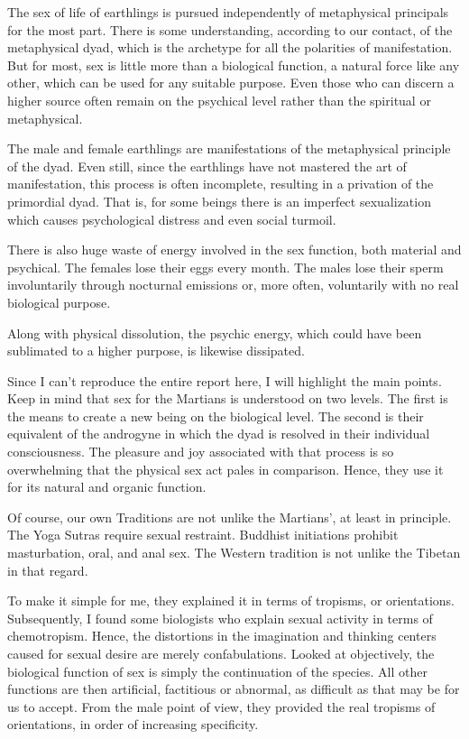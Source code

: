 \begin{quotationx}
The sex of life of earthlings is pursued independently of metaphysical principals for the most part. There is some understanding, according to our contact, of the metaphysical dyad, which is the archetype for all the polarities of manifestation. But for most, sex is little more than a biological function, a natural force like any other, which can be used for any suitable purpose. Even those who can discern a higher source often remain on the psychical level rather than the spiritual or metaphysical.

The male and female earthlings are manifestations of the metaphysical principle of the dyad. Even still, since the earthlings have not mastered the art of manifestation, this process is often incomplete, resulting in a privation of the primordial dyad. That is, for some beings there is an imperfect sexualization which causes psychological distress and even social turmoil.

There is also huge waste of energy involved in the sex function, both material and psychical. The females lose their eggs every month. The males lose their sperm involuntarily through nocturnal emissions or, more often, voluntarily with no real biological purpose.

Along with physical dissolution, the psychic energy, which could have been sublimated to a higher purpose, is likewise dissipated.
\end{quotationx}


Since I can't reproduce the entire report here, I will highlight the main points. Keep in mind that sex for the Martians is understood on two levels. The first is the means to create a new being on the biological level. The second is their equivalent of the androgyne in which the dyad is resolved in their individual consciousness. The pleasure and joy associated with that process is so overwhelming that the physical sex act pales in comparison. Hence, they use it for its natural and organic function.

Of course, our own Traditions are not unlike the Martians', at least in principle. The Yoga Sutras require sexual restraint. Buddhist initiations prohibit masturbation, oral, and anal sex. The Western tradition is not unlike the Tibetan in that regard.

To make it simple for me, they explained it in terms of tropisms, or orientations. Subsequently, I found some biologists who explain sexual activity in terms of chemotropism. Hence, the distortions in the imagination and thinking centers caused for sexual desire are merely confabulations. Looked at objectively, the biological function of sex is simply the continuation of the species. All other functions are then artificial, factitious or abnormal, as difficult as that may be for us to accept. From the male point of view, they provided the real tropisms of orientations, in order of increasing specificity.

